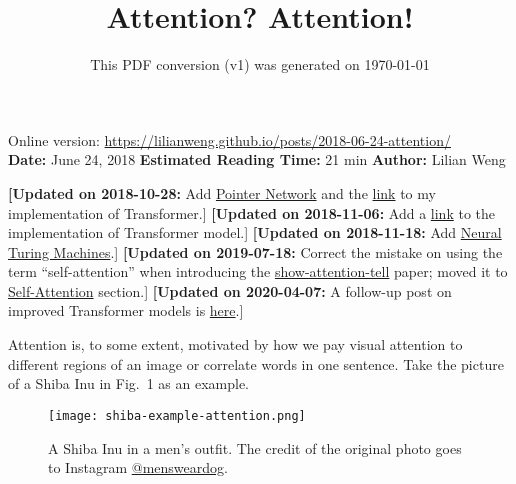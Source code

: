 \documentclass[12pt]{article}
\title{Attention? Attention!}
\date{This PDF conversion (v1) was generated on \today\footnotemark}
\begin{document}
\maketitle
\begin{center}
    Online version: \url{https://lilianweng.github.io/posts/2018-06-24-attention/} \\
    \textbf{Date:} June 24, 2018 \quad
    \textbf{Estimated Reading Time:} 21 min \quad
    \textbf{Author:} Lilian Weng
\end{center}

\textbf{[Updated on 2018-10-28:} Add \hyperref[pointer-network]{Pointer Network} and the \href{https://github.com/lilianweng/transformer-tensorflow}{link} to my implementation of Transformer.]
\newline
\textbf{[Updated on 2018-11-06:} Add a \href{https://github.com/lilianweng/transformer-tensorflow}{link} to the implementation of Transformer model.]
\newline
\textbf{[Updated on 2018-11-18:} Add \hyperref[neural-turing-machines]{Neural Turing Machines}.]
\newline
\textbf{[Updated on 2019-07-18:} Correct the mistake on using the term ``self-attention'' when introducing the \href{https://arxiv.org/abs/1502.03044}{show-attention-tell} paper; moved it to \hyperref[self-attention]{Self-Attention} section.]
\newline
\textbf{[Updated on 2020-04-07:} A follow-up post on improved Transformer models is \href{https://lilianweng.github.io/posts/2020-04-07-the-transformer-family/}{here}.]


\newpage
\tableofcontents
\newpage
\vspace{1em}



Attention is, to some extent, motivated by how we pay visual attention to different regions of an image or correlate words in one sentence. Take the picture of a Shiba Inu in Fig.~1 as an example.

\begin{figure}[H]
    \centering
    \texttt{[image: shiba-example-attention.png]}
    \caption{A Shiba Inu in a men’s outfit. The credit of the original photo goes to Instagram \href{https://www.instagram.com/mensweardog/?hl=en}{@mensweardog}.}
\end{figure}
\end{document}
